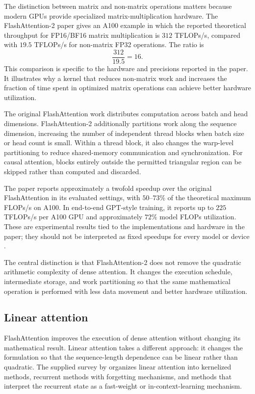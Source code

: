 The distinction between matrix and non-matrix operations matters because
modern GPUs provide specialized matrix-multiplication hardware. The
FlashAttention-2 paper gives an A100 example in which the reported
theoretical throughput for FP16/BF16 matrix multiplication is
\(312\) TFLOPs/s, compared with \(19.5\) TFLOPs/s for non-matrix
FP32 operations. The ratio is
\begin{equation}
    \frac{312}{19.5}=16.
    \label{eq:attn-a100-throughput-ratio}
\end{equation}
This comparison is specific to the hardware and precisions reported in
the paper. It illustrates why a kernel that reduces non-matrix work and
increases the fraction of time spent in optimized matrix operations can
achieve better hardware utilization.

The original FlashAttention work distributes computation across batch
and head dimensions. FlashAttention-2 additionally partitions work along
the sequence dimension, increasing the number of independent thread
blocks when batch size or head count is small. Within a thread block, it
also changes the warp-level partitioning to reduce shared-memory
communication and synchronization. For causal attention, blocks entirely
outside the permitted triangular region can be skipped rather than
computed and discarded.

The paper reports approximately a twofold speedup over the original
FlashAttention in its evaluated settings, with \(50\)--\(73\%\) of
the theoretical maximum FLOPs/s on A100. In end-to-end GPT-style
training, it reports up to \(225\) TFLOPs/s per A100 GPU and
approximately \(72\%\) model FLOPs utilization. These are experimental
results tied to the implementations and hardware in the paper; they
should not be interpreted as fixed speedups for every model or device
\parencite{dao2023flashattention2}.

The central distinction is that FlashAttention-2 does not remove the
quadratic arithmetic complexity of dense attention. It changes the
execution schedule, intermediate storage, and work partitioning so that
the same mathematical operation is performed with less data movement
and better hardware utilization.

\subsection{Linear attention}
\label{subsec:attn-linear-attention}

FlashAttention improves the execution of dense attention without changing
its mathematical result. Linear attention takes a different approach:
it changes the formulation so that the sequence-length dependence can be
linear rather than quadratic. The supplied survey by
\textcite{sun2026efficientattention} organizes linear attention into
kernelized methods, recurrent methods with forgetting mechanisms, and
methods that interpret the recurrent state as a fast-weight or
in-context-learning mechanism.

